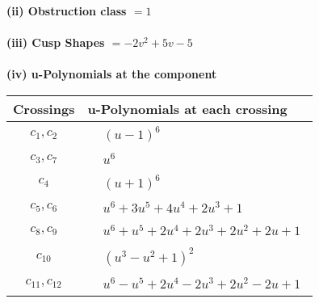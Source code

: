 \documentclass[1p]{elsarticle_modified}
\theoremstyle{definition}
\begin{document}
\flushleft \textbf{(ii) Obstruction class $= 1$}\\~\\
\flushleft \textbf{(iii) Cusp Shapes $= -2 v^2+5 v-5$}\\~\\
\newpage\renewcommand{\arraystretch}{1}
\flushleft \textbf{(iv) u-Polynomials at the component}\newline \\
\begin{tabular}{m{50pt}|m{274pt}}
Crossings & \hspace{64pt}u-Polynomials at each crossing \\
\hline $$\begin{aligned}c_{1},c_{2}\end{aligned}$$&$\begin{aligned}
&(u-1)^6
\end{aligned}$\\
\hline $$\begin{aligned}c_{3},c_{7}\end{aligned}$$&$\begin{aligned}
&u^6
\end{aligned}$\\
\hline $$\begin{aligned}c_{4}\end{aligned}$$&$\begin{aligned}
&(u+1)^6
\end{aligned}$\\
\hline $$\begin{aligned}c_{5},c_{6}\end{aligned}$$&$\begin{aligned}
&u^6+3 u^5+4 u^4+2 u^3+1
\end{aligned}$\\
\hline $$\begin{aligned}c_{8},c_{9}\end{aligned}$$&$\begin{aligned}
&u^6+u^5+2 u^4+2 u^3+2 u^2+2 u+1
\end{aligned}$\\
\hline $$\begin{aligned}c_{10}\end{aligned}$$&$\begin{aligned}
&(u^3- u^2+1)^2
\end{aligned}$\\
\hline $$\begin{aligned}c_{11},c_{12}\end{aligned}$$&$\begin{aligned}
&u^6- u^5+2 u^4-2 u^3+2 u^2-2 u+1
\end{aligned}$\\
\hline
\end{tabular}\\~\\
\end{document}
